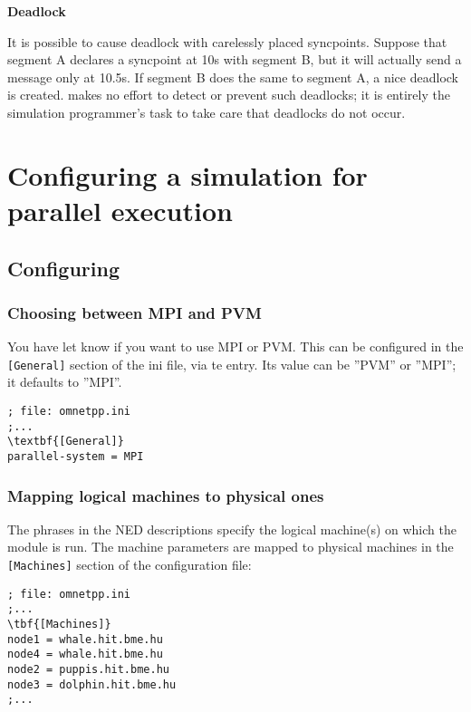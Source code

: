 \textbf{Deadlock}


It is possible to cause deadlock
with carelessly placed syncpoints.  Suppose that segment A declares a
syncpoint at 10s with segment B, but it will actually send a message
only at 10.5s. If segment B does the same to segment A, a nice
deadlock is created. {\opp} makes no effort to detect or prevent such
deadlocks; it is entirely the simulation programmer's task to take
care that deadlocks do not occur.




\section{Configuring a simulation for parallel execution}

\subsection{Configuring {\opp}}

\subsubsection{Choosing between MPI and PVM}


You have let {\opp} know if you want to use MPI or
PVM. This can be configured in the \texttt{[General]}
section of the ini file, via te
 entry. Its value can be
''PVM'' or ''MPI''; it defaults to ''MPI''.

\begin{Verbatim}[commandchars=\\\{\}]
; file: omnetpp.ini
;...
\textbf{[General]}
parallel-system = MPI
\end{Verbatim}


\subsubsection{Mapping logical machines to physical ones}

The  phrases in the NED descriptions
specify the logical machine(s) on which the module is run. The machine
parameters are mapped to physical machines in the \texttt{[Machines]}
section of the configuration file:

\begin{Verbatim}[commandchars=\\\{\}]
; file: omnetpp.ini
;...
\tbf{[Machines]}
node1 = whale.hit.bme.hu
node4 = whale.hit.bme.hu
node2 = puppis.hit.bme.hu
node3 = dolphin.hit.bme.hu
;...
\end{Verbatim}


